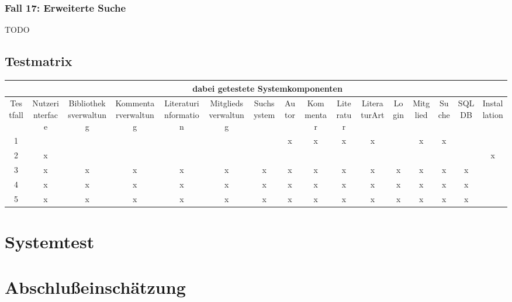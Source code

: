\subsubsection{Fall 17: Erweiterte Suche}
TODO

\subsection{Testmatrix}
\begin{longtable}{|c|c|c|c|c|c|c|c|c|c|c|c|c|c|c|c|}
\hline
 & \multicolumn{15}{c|}{dabei getestete Systemkomponenten} \\\hline
	Testfall & 
	\multicolumn{1}{R{6em}|}{Nutzerinterface} &
	\multicolumn{1}{R{6em}|}{Bibliotheksverwaltung} &
	\multicolumn{1}{R{6em}|}{Kommentarverwaltung} &
	\multicolumn{1}{R{6em}|}{Literaturinformation} &
	\multicolumn{1}{R{6em}|}{Mitgliedsverwaltung} &
	\multicolumn{1}{R{6em}|}{Suchsystem} &
	\multicolumn{1}{R{6em}|}{Autor} &
	\multicolumn{1}{R{6em}|}{Kommentar} &
	\multicolumn{1}{R{6em}|}{Literatur} &
	\multicolumn{1}{R{6em}|}{LiteraturArt} &
	\multicolumn{1}{R{6em}|}{Login} &
	\multicolumn{1}{R{6em}|}{Mitglied} &
	\multicolumn{1}{R{6em}|}{Suche} &
	\multicolumn{1}{R{6em}|}{SQLDB} &
	\multicolumn{1}{R{6em}|}{Installation}\\
\hline\hline
\endhead
1 &   &   &   &   &   &   & x & x & x & x &   & x & x &   &  \\\hline
2 & x &   &   &   &   &   &   &   &   &   &   &   &   &   & x\\\hline
3 & x & x & x & x & x & x & x & x & x & x & x & x & x & x &  \\\hline
4 & x & x & x & x & x & x & x & x & x & x & x & x & x & x &  \\\hline
5 & x & x & x & x & x & x & x & x & x & x & x & x & x & x &  \\\hline
\end{longtable}

\section{Systemtest}

\section{Abschlußeinschätzung}
